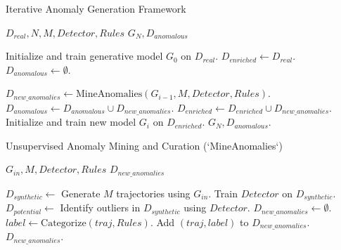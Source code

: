 \documentclass[runningheads]{llncs}
\begin{document}
\begin{algorithm}[h!]
\caption{Iterative Anomaly Generation Framework}\label{alg:iterative-generation}
\begin{algorithmic}[1]
\Require $D_{real}, N, M, Detector, Rules$
\Ensure $G_N, D_{anomalous}$

\State Initialize and train generative model $G_0$ on $D_{real}$.
\State $D_{enriched} \gets D_{real}$.
\State $D_{anomalous} \gets \emptyset$.

    \State $D_{new\_anomalies} \gets \text{MineAnomalies}(G_{i-1}, M, Detector, Rules)$.
    \State $D_{anomalous} \gets D_{anomalous} \cup D_{new\_anomalies}$.
    \State $D_{enriched} \gets D_{enriched} \cup D_{new\_anomalies}$.
    \State Initialize and train new model $G_i$ on $D_{enriched}$.
\EndFor
\State \Return $G_N, D_{anomalous}$.
\end{algorithmic}
\end{algorithm}

\begin{algorithm}[h!]
\caption{Unsupervised Anomaly Mining and Curation (`MineAnomalies`)}\label{alg:anomaly-mining}
\begin{algorithmic}[1]
\Require $G_{in}, M, Detector, Rules$
\Ensure $D_{new\_anomalies}$

\State $D_{synthetic} \gets$ Generate $M$ trajectories using $G_{in}$.
\State Train $Detector$ on $D_{synthetic}$.
\State $D_{potential} \gets$ Identify outliers in $D_{synthetic}$ using $Detector$.
\State $D_{new\_anomalies} \gets \emptyset$.
    \State $label \gets \text{Categorize}(traj, Rules)$.
        \State Add $(traj, label)$ to $D_{new\_anomalies}$.
    \EndIf
\EndFor
\State \Return $D_{new\_anomalies}$.
\end{algorithmic}
\end{algorithm}
\end{document}

